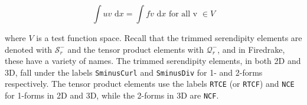 \documentclass[format=acmsmall,screen,timestamp=false,a4paper]{acmart}
\newcommand\josh[1]{\textbf{\textcolor[rgb]{0,.5,1}{[Josh: #1]}}}
\begin{document}
  \begin{equation}
      \int u v  \text{ d}x = \int f v \text{ d}x \text{ for all v } \in V
  \end{equation}

 \noindent where $V$ is a test function space.   Recall that the trimmed serendipity elements are denoted with $\mathcal{S}_r^-$ and the tensor product elements with $\mathcal{Q}^-_r$, and in Firedrake, these have a variety of names.  The trimmed serendipity elements, in both 2D and 3D, fall under the labels \texttt{SminusCurl} and \texttt{SminusDiv} for 1- and 2-forms respectively.  The tensor product elements use the labels \texttt{RTCE} (or \texttt{RTCF}) and  \texttt{NCE} for 1-forms in 2D and 3D, while the 2-forms in 3D are  \texttt{NCF}.  %

\end{document}
